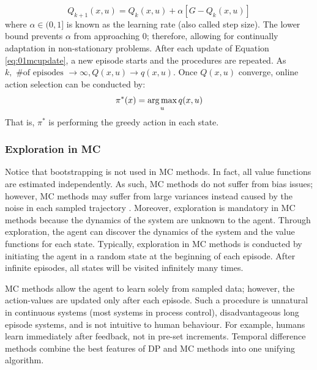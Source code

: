 \begin{equation}
        Q_{k+1}(x, u) = Q_{k}(x, u) + \alpha \left[G - Q_k(x, u) \right]
        \label{eq:01mcupdate}
\end{equation}
where $\alpha \in (0, 1]$ is known as the learning rate (also called step size). The lower bound prevents $\alpha$ from approaching 0; therefore, allowing for continually adaptation in non-stationary problems. After each update of Equation \ref{eq:01mcupdate}, a new episode starts and the procedures are repeated.  As $k, \text{ \# of episodes } \rightarrow \infty, Q(x, u) \rightarrow q(x, u)$. Once $Q(x, u)$ converge, online action selection can be conducted by:
\begin{equation}
    \pi^*(x) = \operatorname*{arg\,max}_{u} q(x, u)
    \label{eq:policy_extract}
\end{equation}
That is, $\pi^*$ is performing the greedy action in each state.  

\subsubsection{Exploration in MC}
Notice that bootstrapping is not used in MC methods.  In fact, all value functions are estimated independently. As such, MC methods do not suffer from bias issues; however, MC methods may suffer from large variances instead caused by the noise in each sampled trajectory \cite{sutton}. Moreover, exploration is mandatory in MC methods because the dynamics of the system are unknown to the agent. Through exploration, the agent can discover the dynamics of the system and the value functions for each state.  Typically, exploration in MC methods is conducted by initiating the agent in a random state at the beginning of each episode. After infinite episodes, all states will be visited infinitely many times.

MC methods allow the agent to learn solely from sampled data; however, the action-values are updated only after each episode. Such a procedure is unnatural in continuous systems (most systems in process control), disadvantageous long episode systems, and is not intuitive to human behaviour. For example, humans learn immediately after feedback, not in pre-set increments. Temporal difference methods combine the best features of DP and MC methods into one unifying algorithm.





